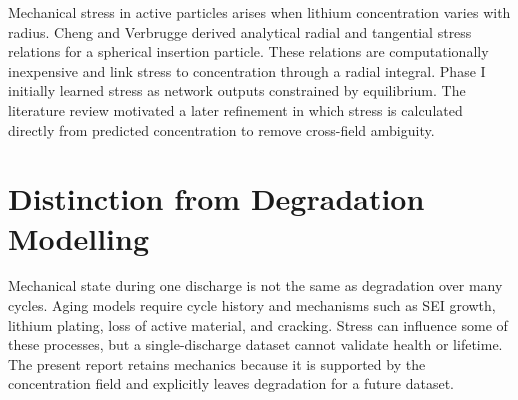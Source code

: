 \documentclass[14pt,a4paper,oneside]{extreport}
\begin{document}
Mechanical stress in active particles arises when lithium concentration varies with radius. Cheng and Verbrugge derived analytical radial and tangential stress relations for a spherical insertion particle. These relations are computationally inexpensive and link stress to concentration through a radial integral. Phase I initially learned stress as network outputs constrained by equilibrium. The literature review motivated a later refinement in which stress is calculated directly from predicted concentration to remove cross-field ambiguity.

\section{Distinction from Degradation Modelling}
Mechanical state during one discharge is not the same as degradation over many cycles. Aging models require cycle history and mechanisms such as SEI growth, lithium plating, loss of active material, and cracking. Stress can influence some of these processes, but a single-discharge dataset cannot validate health or lifetime. The present report retains mechanics because it is supported by the concentration field and explicitly leaves degradation for a future dataset.
\end{document}

